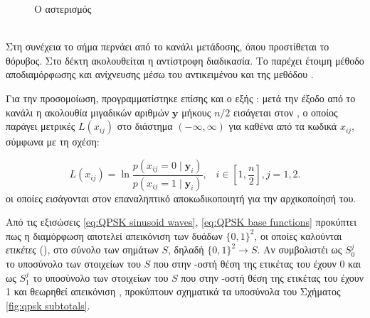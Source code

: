 \begin{figure}[h]
\caption{Ο αστερισμός }
\label{fig:qpsk constellation}
\end{figure}
\hfill\\

Στη συνέχεια το σήμα περνάει από το κανάλι μετάδοσης, όπου προστίθεται το  θόρυβος. Στο δέκτη ακολουθείται η αντίστροφη διαδικασία. Το  παρέχει έτοιμη μέθοδο αποδιαμόρφωσης και ανίχνευσης μέσω του αντικειμένου  και της μεθόδου .

Για την προσομοίωση, προγραμματίστηκε επίσης και ο εξής : μετά την έξοδο από το κανάλι η ακολουθία μιγαδικών αριθμών $\mathbf{y}$ μήκους $n/2$ εισάγεται στον , ο οποίος παράγει μετρικές $L(x_{ij})$ στο διάστημα $(-\infty,\infty)$ για καθένα από τα κωδικά  $x_{ij}$, σύμφωνα με τη σχέση:

\begin{equation}
L(x_{ij})=\ln\frac{p(x_{ij}=0\mid\mathbf{y}_i)}{p(x_{ij}=1\mid\mathbf{y}_i)},\;\;\;i\in\left[1,\frac{n}{2}\right],j=1,2.
\label{eq:QPSK LLR}
\end{equation}
οι οποίες εισάγονται στον επαναληπτικό αποκωδικοποιητή για την αρχικοποίησή του.

Από τις εξισώσεις \ref{eq:QPSK sinusoid waves}, \ref{eq:QPSK base functions} προκύπτει πως η διαμόρφωση  αποτελεί απεικόνιση των δυάδων $\{0,1\}^2$, οι οποίες καλούνται \textit{ετικέτες} (), στο σύνολο των  σημάτων $S$, δηλαδή $\{0,1\}^2\to{S}$. Αν συμβολιστέι ως ${S}_0^j$  το υποσύνολο των στοιχείων του $S$ που στην -οστή θέση της ετικέτας του έχουν 0 και ως ${S}_1^j$ το υποσύνολο των στοιχείων του $S$ που στην -οστή θέση της ετικέτας του έχουν 1 και θεωρηθεί απεικόνιση , προκύπτουν σχηματικά τα υποσύνολα του Σχήματος \ref{fig:qpsk subtotals}.

